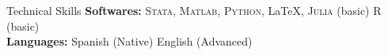\documentclass{resume_style} %
\begin{document}

\begin{rSection}{Technical Skills}
\textbf{Softwares:}
\textsc{Stata}, \textsc{Matlab}, \textsc{Python}, \LaTeX, \textsc{Julia} (basic) \textsc{R} (basic) \\
\textbf{Languages:} Spanish (Native) English (Advanced) 
\end{rSection}



\end{document}
